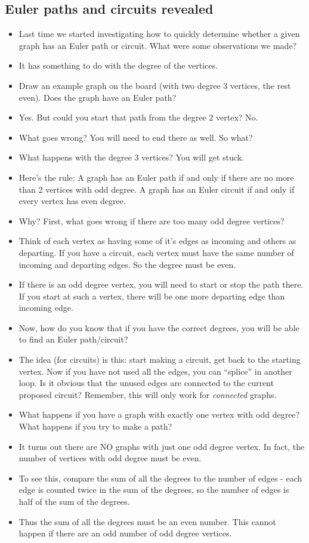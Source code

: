 \subsection*{Euler paths and circuits revealed}
\begin{itemize}
  \item Last time we started investigating how to quickly determine whether a given graph has an Euler path or circuit.  What were some observations we made?
  \item It has something to do with the degree of the vertices.
  \item Draw an example graph on the board (with two degree 3 vertices, the rest even).  Does the graph have an Euler path?
  \item Yes.  But could you start that path from the degree 2 vertex?  No.
  \item What goes wrong?  You will need to end there as well.  So what?
  \item What happens with the degree 3 vertices?  You will get stuck.
  \item Here's the rule: A graph has an Euler path if and only if there are no more than 2 vertices with odd degree.  A graph has an Euler circuit if and only if every vertex has even degree.
  \item Why?  First, what goes wrong if there are too many odd degree vertices?
  \item Think of each vertex as having some of it's edges as incoming and others as departing.  If you have a circuit, each vertex must have the same number of incoming and departing edges.  So the degree must be even.
  \item If there is an odd degree vertex, you will need to start or stop the path there.  If you start at such a vertex, there will be one more departing edge than incoming edge.  
  \item Now, how do you know that if you have the correct degrees, you will be able to find an Euler path/circuit?
  \item The idea (for circuits) is this: start making a circuit, get back to the starting vertex.  Now if you have not used all the edges, you can ``splice'' in another loop.  Is it obvious that the unused edges are connected to the current proposed circuit?  Remember, this will only work for {\em connected} graphs.
  \item What happens if you have a graph with exactly one vertex with odd degree?  What happens if you try to make a path?
  \item It turns out there are NO graphs with just one odd degree vertex.  In fact, the number of vertices with odd degree must be even.  
  \item To see this, compare the sum of all the degrees to the number of edges - each edge is counted twice in the sum of the degrees, so the number of edges is half of the sum of the degrees.  
  \item Thus the sum of all the degrees must be an even number.  This cannot happen if there are an odd number of odd degree vertices.
\end{itemize}
